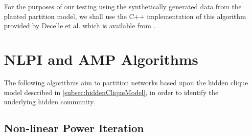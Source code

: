 For the purposes of our testing using the synthetically generated data from the planted partition model, we shall use the C++ implementation of this algorithm provided by Decelle et al. \cite{DKM+13} which is available from \cite{ModeNet}.


\section{NLPI and AMP Algorithms}
\label{sec:NLPIAndAMPAlgorithmsCommunityDetection}

The following algorithms aim to partition networks based upon the hidden clique model described in \cref{subsec:hiddenCliqueModel}, in order to identify the underlying hidden community.


\subsection{Non-linear Power Iteration}
\label{subsec:nonLinearPowerIteration}

